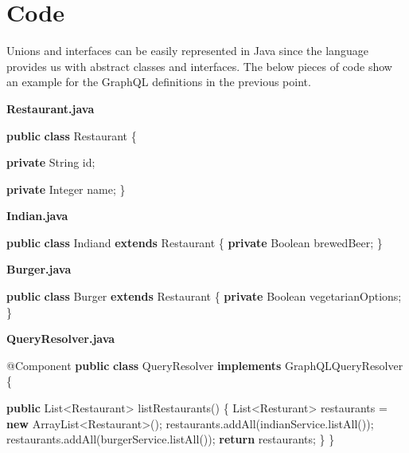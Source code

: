 \documentclass[]{book}
\newenvironment{Shaded}{\begin{snugshade}}{\end{snugshade}}
\newcommand{\KeywordTok}[1]{\textcolor[rgb]{0.13,0.29,0.53}{\textbf{#1}}}
\newcommand{\FunctionTok}[1]{\textcolor[rgb]{0.00,0.00,0.00}{#1}}
\newcommand{\BuiltInTok}[1]{#1}
\newcommand{\AttributeTok}[1]{\textcolor[rgb]{0.77,0.63,0.00}{#1}}
\newcommand{\NormalTok}[1]{#1}
\begin{document}
\section{Code}\label{code-2}

Unions and interfaces can be easily represented in Java since the
language provides us with abstract classes and interfaces. The below
pieces of code show an example for the GraphQL definitions in the
previous point.

\textbf{Restaurant.java}

\begin{Shaded}
\begin{Highlighting}[]
\KeywordTok{public} \KeywordTok{class}\NormalTok{ Restaurant \{}
    
    \KeywordTok{private} \BuiltInTok{String}\NormalTok{ id;}
    
    \KeywordTok{private} \BuiltInTok{Integer}\NormalTok{ name;}
\NormalTok{\}}
\end{Highlighting}
\end{Shaded}

\textbf{Indian.java}

\begin{Shaded}
\begin{Highlighting}[]
\KeywordTok{public} \KeywordTok{class}\NormalTok{ Indiand }\KeywordTok{extends}\NormalTok{ Restaurant \{}
    \KeywordTok{private} \BuiltInTok{Boolean}\NormalTok{ brewedBeer;}
\NormalTok{\}}
\end{Highlighting}
\end{Shaded}

\textbf{Burger.java}

\begin{Shaded}
\begin{Highlighting}[]
\KeywordTok{public} \KeywordTok{class}\NormalTok{ Burger }\KeywordTok{extends}\NormalTok{ Restaurant \{}
    \KeywordTok{private} \BuiltInTok{Boolean}\NormalTok{ vegetarianOptions;}
\NormalTok{\}}
\end{Highlighting}
\end{Shaded}

\textbf{QueryResolver.java}

\begin{Shaded}
\begin{Highlighting}[]
\AttributeTok{@Component}
\KeywordTok{public} \KeywordTok{class}\NormalTok{ QueryResolver }\KeywordTok{implements}\NormalTok{ GraphQLQueryResolver \{}
    
    \KeywordTok{public} \BuiltInTok{List}\NormalTok{<Restaurant> }\FunctionTok{listRestaurants}\NormalTok{() \{}
        \BuiltInTok{List}\NormalTok{<Resturant> restaurants = }\KeywordTok{new} \BuiltInTok{ArrayList}\NormalTok{<Restaurant>();}
\NormalTok{        restaurants.}\FunctionTok{addAll}\NormalTok{(indianService.}\FunctionTok{listAll}\NormalTok{());}
\NormalTok{        restaurants.}\FunctionTok{addAll}\NormalTok{(burgerService.}\FunctionTok{listAll}\NormalTok{());}
        \KeywordTok{return}\NormalTok{ restaurants;}
\NormalTok{    \} }
\NormalTok{\}}
\end{Highlighting}
\end{Shaded}
\end{document}
